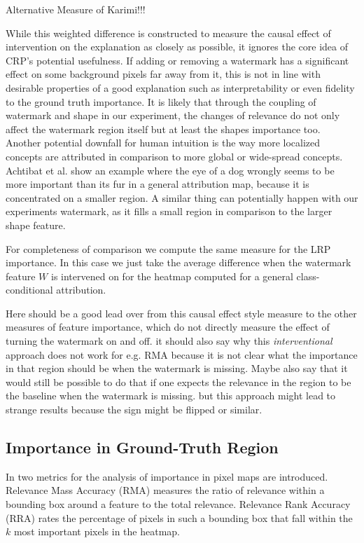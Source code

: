 Alternative Measure of Karimi!!!

While this weighted difference is constructed to measure the causal effect of intervention on the explanation as closely as possible, it ignores the core idea of CRP's potential usefulness. If adding or removing a watermark has a significant effect on some background pixels far away from it, this is not in line with desirable properties of a good explanation such as interpretability or even fidelity to the ground truth importance. It is likely that through the coupling of watermark and shape in our experiment, the changes of relevance do not only affect the watermark region itself but at least the shapes importance too. 
Another potential downfall for human intuition is the way more localized concepts are attributed in comparison to more global or wide-spread concepts. Achtibat et al. \cite{Achtibat2022} show an example where the eye of a dog wrongly seems to be more important than its fur in a general attribution map, because it is concentrated on a smaller region. A similar thing can potentially happen with our experiments watermark, as it fills a small region in comparison to the larger shape feature. 

For completeness of comparison we compute the same measure for the LRP importance. In this case we just take the average difference when the watermark feature $W$ is intervened on for the heatmap computed for a general class-conditional attribution. 

Here should be a good lead over from this causal effect style measure to the other measures of feature importance, which do not directly measure the effect of turning the watermark on and off. it should also say why this \textit{interventional} approach does not work for e.g. RMA because it is not clear what the importance in that region should be when the watermark is missing. Maybe also say that it would still be possible to do that if one expects the relevance in the region to be the baseline when the watermark is missing. but this approach might lead to strange results because the sign might be flipped or similar.

\subsection{Importance in Ground-Truth Region}
In \cite{Arras2022} two metrics for the analysis of importance in pixel maps are introduced. Relevance Mass Accuracy (RMA) measures the ratio of relevance within a bounding box around a feature to the total relevance. Relevance Rank Accuracy (RRA) rates the percentage of pixels in such a bounding box that fall within the $k$ most important pixels in the heatmap.

